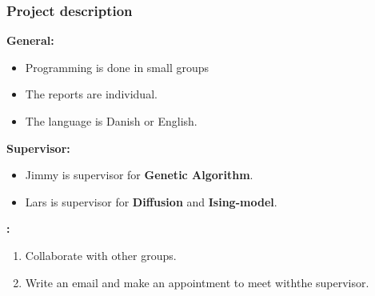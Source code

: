 \documentclass{beamer}
\begin{document}
\frame
{

    \frametitle{Project description}

    \textbf{General:}

    \begin{itemize}

        \item Programming is done in small groups

        \item The reports are individual.

        \item The language is Danish or English.

    \end{itemize}

    \bigskip

    \textbf{Supervisor:}

    \begin{itemize}

        \item Jimmy is supervisor for {\bf Genetic Algorithm}.

        \item Lars is supervisor for {\bf Diffusion} and {\bf Ising-model}.

    \end{itemize}

    \bigskip

    \textbf{:}

    \begin{enumerate}

        \item Collaborate with other groups.

        \item Write an email and make an appointment to meet with\newline the supervisor.

    \end{enumerate}

}


\end{document}
